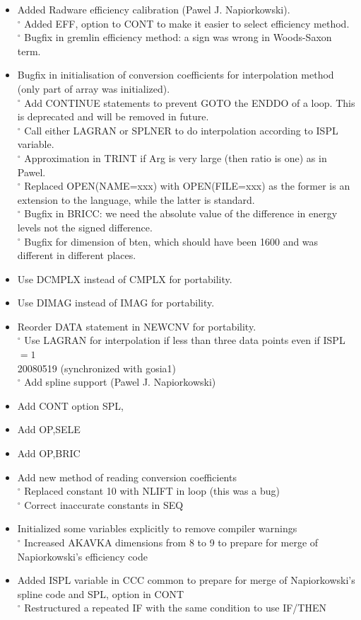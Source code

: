 \documentclass[10pt]{article}
\begin{document}
\begin{itemize}
  \item Added Radware efficiency calibration (Pawel J. Napiorkowski).\\
${ }^{\circ}$ Added EFF, option to CONT to make it easier to select efficiency method.\\
${ }^{\circ}$ Bugfix in gremlin efficiency method: a sign was wrong in Woods-Saxon term.
  \item Bugfix in initialisation of conversion coefficients for interpolation method (only part of array was initialized).\\
${ }^{\circ}$ Add CONTINUE statements to prevent GOTO the ENDDO of a loop. This is deprecated and will be removed in future.\\
${ }^{\circ}$ Call either LAGRAN or SPLNER to do interpolation according to ISPL variable.\\
${ }^{\circ}$ Approximation in TRINT if Arg is very large (then ratio is one) as in Pawel.\\
${ }^{\circ}$ Replaced OPEN(NAME=xxx) with OPEN(FILE=xxx) as the former is an extension to the language, while the latter is standard.\\
${ }^{\circ}$ Bugfix in BRICC: we need the absolute value of the difference in energy levels not the signed difference.\\
${ }^{\circ}$ Bugfix for dimension of bten, which should have been 1600 and was different in different places.
  \item Use DCMPLX instead of CMPLX for portability.
  \item Use DIMAG instead of IMAG for portability.
  \item Reorder DATA statement in NEWCNV for portability.\\
${ }^{\circ}$ Use LAGRAN for interpolation if less than three data points even if ISPL $=1$\\
20080519 (synchronized with gosia1)\\
${ }^{\circ}$ Add spline support (Pawel J. Napiorkowski)
  \item Add CONT option SPL,
  \item Add OP,SELE
  \item Add OP,BRIC
  \item Add new method of reading conversion coefficients\\
${ }^{\circ}$ Replaced constant 10 with NLIFT in loop (this was a bug)\\
${ }^{\circ}$ Correct inaccurate constants in SEQ
  \item Initialized some variables explicitly to remove compiler warnings\\
${ }^{\circ}$ Increased AKAVKA dimensions from 8 to 9 to prepare for merge of Napiorkowski's efficiency code
  \item Added ISPL variable in CCC common to prepare for merge of Napiorkowski's spline code and SPL, option in CONT\\
${ }^{\circ}$ Restructured a repeated IF with the same condition to use IF/THEN
\end{itemize}
\end{document}
